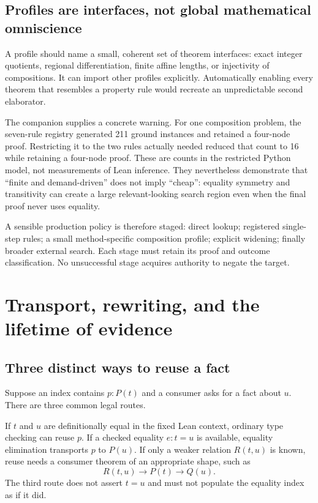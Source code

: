 \documentclass[11pt,a4paper]{article}
\theoremstyle{definition}
\theoremstyle{remark}
\begin{document}
\subsection{Profiles are interfaces, not global mathematical omniscience}

A profile should name a small, coherent set of theorem interfaces: exact integer
quotients, regional differentiation, finite affine lengths, or injectivity of
compositions. It can import other profiles explicitly. Automatically enabling
every theorem that resembles a property rule would recreate an unpredictable
second elaborator.

The companion supplies a concrete warning. For one composition problem, the
seven-rule registry generated 211 ground instances and retained a four-node
proof. Restricting it to the two rules actually needed reduced that count to
16 while retaining a four-node proof. These are counts in the restricted Python
model, not measurements of Lean inference. They nevertheless demonstrate that
``finite and demand-driven'' does not imply ``cheap'': equality symmetry and
transitivity can create a large relevant-looking search region even when the
final proof never uses equality.

A sensible production policy is therefore staged: direct lookup; registered
single-step rules; a small method-specific composition profile; explicit
widening; finally broader external search. Each stage must retain its proof
and outcome classification. No unsuccessful stage acquires authority to negate
the target.

\section{Transport, rewriting, and the lifetime of evidence}\label{sec:transport}

\subsection{Three distinct ways to reuse a fact}

Suppose an index contains $p:P(t)$ and a consumer asks for a fact about $u$.
There are three common legal routes.

If $t$ and $u$ are definitionally equal in the fixed Lean context, ordinary
type checking can reuse $p$. If a checked equality $e:t=u$ is available,
equality elimination transports $p$ to $P(u)$. If only a weaker relation
$R(t,u)$ is known, reuse needs a consumer theorem of an appropriate shape, such
as
\[
 R(t,u)\to P(t)\to Q(u).
\]
The third route does not assert $t=u$ and must not populate the equality index
as if it did.
\end{document}
